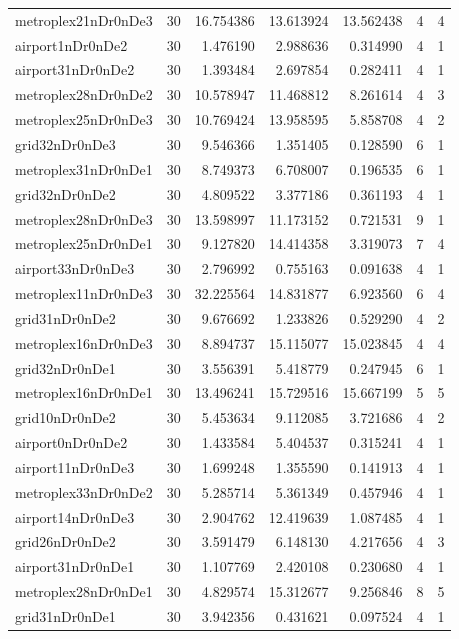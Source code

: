 \begin{longtable}{|l|r|r|r|r|r|r|}
metroplex21nDr0nDe3 & 30 & 16.754386 & 13.613924 & 13.562438 & 4 & 4 \\
airport1nDr0nDe2 & 30 & 1.476190 & 2.988636 & 0.314990 & 4 & 1 \\
airport31nDr0nDe2 & 30 & 1.393484 & 2.697854 & 0.282411 & 4 & 1 \\
metroplex28nDr0nDe2 & 30 & 10.578947 & 11.468812 & 8.261614 & 4 & 3 \\
metroplex25nDr0nDe3 & 30 & 10.769424 & 13.958595 & 5.858708 & 4 & 2 \\
grid32nDr0nDe3 & 30 & 9.546366 & 1.351405 & 0.128590 & 6 & 1 \\
metroplex31nDr0nDe1 & 30 & 8.749373 & 6.708007 & 0.196535 & 6 & 1 \\
grid32nDr0nDe2 & 30 & 4.809522 & 3.377186 & 0.361193 & 4 & 1 \\
metroplex28nDr0nDe3 & 30 & 13.598997 & 11.173152 & 0.721531 & 9 & 1 \\
metroplex25nDr0nDe1 & 30 & 9.127820 & 14.414358 & 3.319073 & 7 & 4 \\
airport33nDr0nDe3 & 30 & 2.796992 & 0.755163 & 0.091638 & 4 & 1 \\
metroplex11nDr0nDe3 & 30 & 32.225564 & 14.831877 & 6.923560 & 6 & 4 \\
grid31nDr0nDe2 & 30 & 9.676692 & 1.233826 & 0.529290 & 4 & 2 \\
metroplex16nDr0nDe3 & 30 & 8.894737 & 15.115077 & 15.023845 & 4 & 4 \\
grid32nDr0nDe1 & 30 & 3.556391 & 5.418779 & 0.247945 & 6 & 1 \\
metroplex16nDr0nDe1 & 30 & 13.496241 & 15.729516 & 15.667199 & 5 & 5 \\
grid10nDr0nDe2 & 30 & 5.453634 & 9.112085 & 3.721686 & 4 & 2 \\
airport0nDr0nDe2 & 30 & 1.433584 & 5.404537 & 0.315241 & 4 & 1 \\
airport11nDr0nDe3 & 30 & 1.699248 & 1.355590 & 0.141913 & 4 & 1 \\
metroplex33nDr0nDe2 & 30 & 5.285714 & 5.361349 & 0.457946 & 4 & 1 \\
airport14nDr0nDe3 & 30 & 2.904762 & 12.419639 & 1.087485 & 4 & 1 \\
grid26nDr0nDe2 & 30 & 3.591479 & 6.148130 & 4.217656 & 4 & 3 \\
airport31nDr0nDe1 & 30 & 1.107769 & 2.420108 & 0.230680 & 4 & 1 \\
metroplex28nDr0nDe1 & 30 & 4.829574 & 15.312677 & 9.256846 & 8 & 5 \\
grid31nDr0nDe1 & 30 & 3.942356 & 0.431621 & 0.097524 & 4 & 1 \\

\end{longtable}
